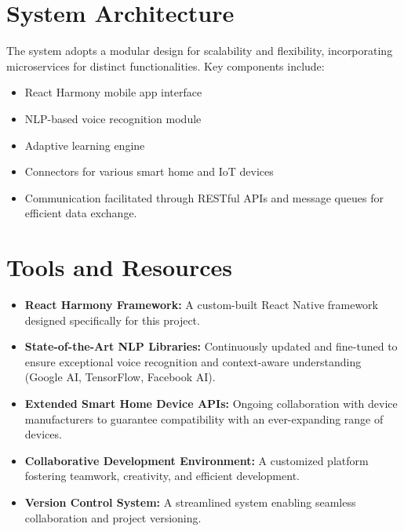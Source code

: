 \documentclass[12pt]{article}
\begin{document}
\section*{System Architecture}
The system adopts a modular design for scalability and flexibility, incorporating microservices for distinct functionalities. Key components include:
\begin{itemize}
  \item React Harmony mobile app interface
  \item NLP-based voice recognition module
  \item Adaptive learning engine
  \item Connectors for various smart home and IoT devices
  \item Communication facilitated through RESTful APIs and message queues for efficient data exchange.
\end{itemize}

\vspace{290pt}

\section*{Tools and Resources}
\begin{itemize}
  \item \textbf{React Harmony Framework:} A custom-built React Native framework designed specifically for this project.
  
  \item \textbf{State-of-the-Art NLP Libraries:} Continuously updated and fine-tuned to ensure exceptional voice recognition and context-aware understanding (Google AI, TensorFlow, Facebook AI).
  
  \item \textbf{Extended Smart Home Device APIs:} Ongoing collaboration with device manufacturers to guarantee compatibility with an ever-expanding range of devices.
  
  \item \textbf{Collaborative Development Environment:} A customized platform fostering teamwork, creativity, and efficient development.
  
  \item \textbf{Version Control System:} A streamlined system enabling seamless collaboration and project versioning.
\end{itemize}
\end{document}
